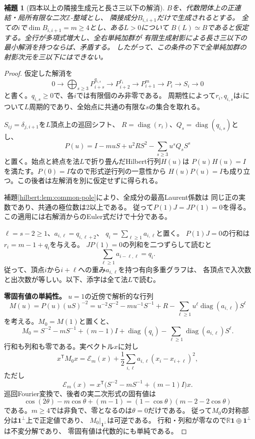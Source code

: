 \documentclass[11pt,a4paper]{ltjsarticle}
\newtheorem{lemma}[theorem]{補題}
\theoremstyle{definition}
\begin{document}
\begin{lemma}[四本以上の隣接生成元と長さ三以下の解消]
\label{n4:lem:periodic-pd3-obstruction}
$B$を、代数閉体上の正連結・局所有限な二次$\mathbb Z$-整域とし、
隣接成分$B_{i,i+1}$だけで生成されるとする。
全ての$i$で$\dim B_{i,i+1}=m\ge4$とし、ある$L>0$について
$B(L)\simeq B$であると仮定する。全行が多項式増大し、全右単純加群が
有限生成射影による長さ三以下の最小解消を持つならば、矛盾する。
したがって、この条件の下で全単純加群の射影次元を三以下にはできない。
\end{lemma}
\begin{proof}
仮定した解消を
\[
0\longrightarrow\bigoplus_{s\ge3}P_{i+s}^{q_{i,s}}
\longrightarrow P_{i+2}^{r_i}\longrightarrow P_{i+1}^{m}
\longrightarrow P_i\longrightarrow S_i\longrightarrow0
\]
と書く。$q_{i,s}\ge0$で、各$i$では有限個のみ非零である。
周期性によって$r_i,q_{i,s}$は$i$について$L$周期的であり、全始点に共通の有限な$s$の集合を取れる。

$S_{ij}=\delta_{j,i+1}$を$L$頂点上の巡回シフト、
$R=\operatorname{diag}(r_i)$、$Q_s=\operatorname{diag}(q_{i,s})$とし、
\[
P(u)=I-muS+u^2RS^2-\sum_{s\ge3}u^sQ_sS^s
\]
と置く。始点と終点を法$L$で折り畳んだHilbert行列$H(u)$は
$P(u)H(u)=I$を満たす。$P(0)=I$なので形式逆行列の一意性から
$H(u)P(u)=I$も成り立つ。この後者は左解消を別に仮定せずに得られる。

補題\ref{hilbert:lem:common-pole}により、全成分の最高Laurent係数は
同じ正の実数であり、共通の極位数は2以上である。
従って$P(1)J=JP(1)=0$を得る。この適用には右解消からのEuler式だけで十分である。

$\ell=s-2\ge1$、$a_{i,\ell}=q_{i,\ell+2}$、
$q_i=\sum_{\ell\ge1}a_{i,\ell}$と置く。
$P(1)J=0$の行和は$r_i=m-1+q_i$を与える。
$JP(1)=0$の列和を二つずらして読むと
\[
\sum_{\ell\ge1}a_{i-\ell,\ell}=q_i.
\]
従って、頂点$i$から$i+\ell$への重み$a_{i,\ell}$を持つ有向多重グラフは、
各頂点で入次数と出次数が等しい。以下、添字は全て法$L$で読む。

\par\smallskip\noindent\textbf{零固有値の単純性。}\quad
$u=1$の近傍で解析的な行列
\[
M(u)=P(u)(uS)^{-2}
=u^{-2}S^{-2}-mu^{-1}S^{-1}+R
 -\sum_{\ell\ge1}u^\ell\operatorname{diag}(a_{i,\ell})S^\ell
\]
を考える。$M_0=M(1)$と置くと、
\[
M_0=S^{-2}-mS^{-1}+(m-1)I
 +\operatorname{diag}(q_i)-\sum_{\ell\ge1}\operatorname{diag}(a_{i,\ell})S^\ell.
\]
行和も列和も零である。実ベクトル$x$に対し
\[
x^{\mathsf T}M_0x=\mathcal E_m(x)
 +\frac12\sum_{i,\ell}a_{i,\ell}(x_i-x_{i+\ell})^2,
\]
ただし
\[
\mathcal E_m(x)=x^{\mathsf T}\bigl(S^{-2}-mS^{-1}+(m-1)I\bigr)x.
\]
巡回Fourier変換で、後者の実二次形式の固有値は
\[
\cos(2\theta)-m\cos\theta+(m-1)
=(1-\cos\theta)(m-2-2\cos\theta)
\]
である。$m\ge4$では非負で、零となるのは$\theta=0$だけである。
従って$M_0$の対称部分は$\boldsymbol1^\perp$上で正定値であり、
$M_0|_{\boldsymbol1^\perp}$は可逆である。
行和・列和が零なので$\mathbb R\boldsymbol1\oplus\boldsymbol1^\perp$は不変分解であり、
零固有値は代数的にも単純である。


\end{proof}
\end{document}
